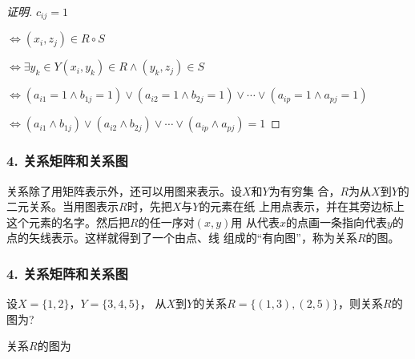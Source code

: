 \documentclass{beamer}
\begin{document}
\begin{CJK*}{UTF8}{gbsn}
\begin{frame}
\begin{proof}[证明]
    \pause \hspace{0.5cm}$c_{ij}=1$
    
    \pause$\Leftrightarrow(x_i,z_j)\in R\circ S$
    
    \pause$\Leftrightarrow\exists y_k\in Y (x_i,y_k)\in R\land (y_k,z_j)\in S$

    \pause$\Leftrightarrow(a_{i1}=1\land b_{1j}=1)\lor (a_{i2}=1\land b_{2j}=1)\lor \cdots \lor (a_{ip}=1\land a_{pj}=1)$
    
    \pause$\Leftrightarrow(a_{i1}\land b_{1j})\lor (a_{i2}\land b_{2j})\lor \cdots \lor (a_{ip}\land a_{pj}) = 1$

  \end{proof}
\end{frame}

\begin{frame}
  \frametitle{4. 关系矩阵和关系图}
  \begin{Def}\justifying\let\raggedright\justifying
    关系除了用矩阵表示外，还可以用图来表示。设$X$和$Y$为有穷集
合，$R$为从$X$到$Y$的二元关系。当用图表示$R$时，先把$X$与$Y$的元素在纸
上用点表示，并在其旁边标上这个元素的名字。然后把$R$的任一序对$(x,y)$用
从代表$x$的点画一条指向代表$y$的点的矢线表示。这样就得到了一个由点、线
组成的“有向图”，称为关系$R$的图。
  \end{Def}
\end{frame}
\begin{frame}
  \frametitle{4. 关系矩阵和关系图}
  \begin{Ex}
    设$X=\{1,2\}$，$Y=\{3,4,5\}$， 从$X$到$Y$的关系$R=\{(1,3),  (2, 5)\}$，则关系$R$的图为?
  \end{Ex}
  \pause
  关系$R$的图为

\end{frame}


\end{CJK*}
\end{document}
